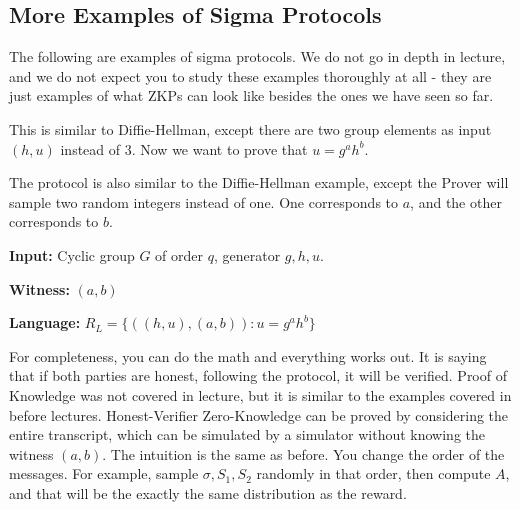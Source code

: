 \subsection{More Examples of Sigma Protocols}

\begin{remark}
The following are examples of sigma protocols. We do not go in depth in lecture, and we do not expect you to study these examples thoroughly at all - they are just examples of what ZKPs can look like besides the ones we have seen so far.
\end{remark}

\begin{example}

This is similar to Diffie-Hellman, except there are two group elements as input $(h, u)$ instead of 3. Now we want to prove that $u = g^a h^b$.

The protocol is also similar to the Diffie-Hellman example, except the Prover will sample two random integers instead of one. One corresponds to $a$, and the other corresponds to $b$.

\textbf{Input:} Cyclic group $G$ of order $q$, generator $g, h, u$.

\textbf{Witness:} $(a, b)$

\textbf{Language:} $R_{L} = \{ ((h, u), (a, b)): u = g^a h^b\}$


For completeness, you can do the math and everything works out. It is saying that if both parties are honest, following the protocol, it will be verified. Proof of Knowledge was not covered in lecture, but it is similar to the examples covered in before lectures. Honest-Verifier Zero-Knowledge can be proved by considering the entire transcript, which can be simulated by a simulator without knowing the witness $(a, b)$. The intuition is the same as before. You change the order of the messages. For example, sample $\sigma, S_1, S_2$ randomly in that order, then compute $A$, and that will be the exactly the same distribution as the reward.

\end{example}

